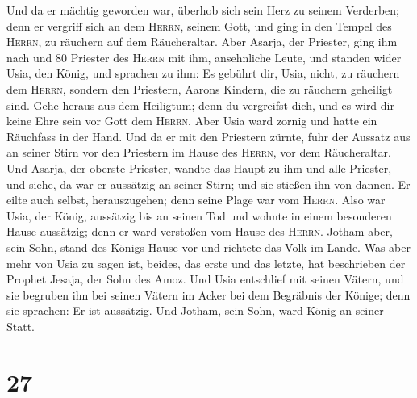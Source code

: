  Und da er mächtig geworden war, überhob sich sein Herz
zu seinem Verderben; denn er vergriff sich an dem \textsc{Herrn}, seinem
Gott, und ging in den Tempel des \textsc{Herrn}, zu räuchern auf dem
Räucheraltar.  Aber Asarja, der Priester, ging ihm nach
und 80 Priester des \textsc{Herrn} mit ihm, ansehnliche Leute,
 und standen wider Usia, den König, und sprachen zu ihm:
Es gebührt dir, Usia, nicht, zu räuchern dem \textsc{Herrn}, sondern den
Priestern, Aarons Kindern, die zu räuchern geheiligt sind. Gehe heraus
aus dem Heiligtum; denn du vergreifst dich, und es wird dir keine Ehre
sein vor Gott dem \textsc{Herrn}.  Aber Usia ward zornig
und hatte ein Räuchfass in der Hand. Und da er mit den Priestern zürnte,
fuhr der Aussatz aus an seiner Stirn vor den Priestern im Hause des
\textsc{Herrn}, vor dem Räucheraltar.  Und Asarja, der
oberste Priester, wandte das Haupt zu ihm und alle Priester, und siehe,
da war er aussätzig an seiner Stirn; und sie stießen ihn von dannen. Er
eilte auch selbst, herauszugehen; denn seine Plage war vom
\textsc{Herrn}.  Also war Usia, der König, aussätzig bis
an seinen Tod und wohnte in einem besonderen Hause aussätzig; denn er
ward verstoßen vom Hause des \textsc{Herrn}. Jotham aber, sein Sohn,
stand des Königs Hause vor und richtete das Volk im Lande.
 Was aber mehr von Usia zu sagen ist, beides, das erste
und das letzte, hat beschrieben der Prophet Jesaja, der Sohn des Amoz.
 Und Usia entschlief mit seinen Vätern, und sie begruben
ihn bei seinen Vätern im Acker bei dem Begräbnis der Könige; denn sie
sprachen: Er ist aussätzig. Und Jotham, sein Sohn, ward König an seiner
Statt.

\hypertarget{section-26}{%
\section{27}\label{section-26}}


